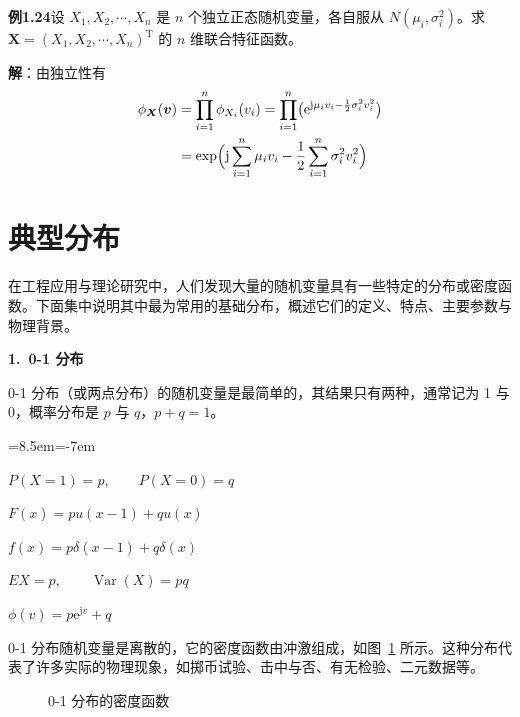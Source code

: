 \documentclass[11pt,openany,UTF8]{ctexbook}
\newcommand{\eu}{\mathrm{e}}                       %
\newcommand{\ju}{\mathrm{j}}                       %
\DeclareMathOperator{\Var}{Var}                    %
\newcommand{\bX}{\bm{X}}
\newcommand{\bhead}[1]{\par\medskip\noindent\textbf{#1}\par\smallskip}
\begin{document}
\begin{examplebox}
\textbf{例1.24}\quad 设 $X_1,X_2,\cdots,X_n$ 是 $n$ 个独立正态随机变量\nobreak，各自服从 $N(\mu_i,\sigma_i^2)$\nobreak。求 $\bX=(X_1,X_2,\cdots,X_n)^{\mathrm{T}}$ 的 $n$ 维联合特征函数\nobreak。

\textbf{解}\nobreak：由独立性有
\[
\begin{aligned}
\phi_{\bX}(\bm{v})&=\prod_{i=1}^{n}\phi_{X_i}(v_i)
 =\prod_{i=1}^{n}\bigl(\eu^{\ju\mu_iv_i-\frac{1}{2}\sigma_i^2v_i^2}\bigr)\\
&=\exp\Bigl(\ju\sum_{i=1}^{n}\mu_iv_i-\frac{1}{2}\sum_{i=1}^{n}\sigma_i^2v_i^2\Bigr)
\end{aligned}
\]
\end{examplebox}

\section{典型分布}

在工程应用与理论研究中\nobreak，人们发现大量的随机变量具有一些特定的分布或密度函数\nobreak。下面集中说明其中最为常用的基础分布\nobreak，概述它们的定义\nobreak、特点\nobreak、主要参数与物理背景\nobreak。

\bhead{1.\ 0-1 分布}

0-1 分布（或两点分布\nobreak）的随机变量是最简单的\nobreak，其结果只有两种\nobreak，通常记为 1 与 0\nobreak，概率分布是 $p$ 与 $q$\nobreak，$p+q=1$\nobreak。

\begin{list}{}{\leftmargin=8.5em\itemindent=-7em\itemsep=4pt\topsep=4pt\parsep=0pt}
  \item {}\quad $P(X=1)=p,\qquad P(X=0)=q$
  \item {}\quad $F(x)=pu(x-1)+qu(x)$
  \item {}\quad $f(x)=p\delta(x-1)+q\delta(x)$
  \item {}\quad $EX=p,\qquad \Var(X)=pq$
  \item {}\quad $\phi(v)=p\eu^{\ju v}+q$
\end{list}

0-1 分布随机变量是离散的\nobreak，它的密度函数由冲激组成\nobreak，如图~\ref{fig:1.15} 所示\nobreak。这种分布代表了许多实际的物理现象\nobreak，如掷币试验\nobreak、击中与否\nobreak、有无检验\nobreak、二元数据等\nobreak。

\begin{figure}[htbp]
  \centering
  \caption{0-1 分布的密度函数}\label{fig:1.15}
\end{figure}
\end{document}
